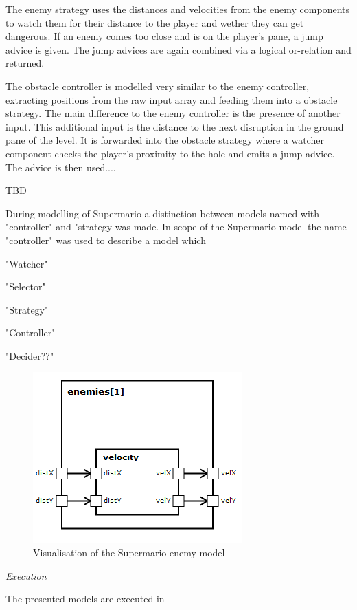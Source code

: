 The enemy strategy uses the distances and velocities from the enemy components to watch them for their distance to the player and wether they can get dangerous. If an enemy comes too close and is on the player's pane, a jump advice is given. The jump advices are again combined via a logical or-relation and returned.


The obstacle controller is modelled very similar to the enemy controller, extracting positions from the raw input array and feeding them into a obstacle strategy. The main difference to the enemy controller is the presence of another input. This additional input is the distance to the next disruption in the ground pane of the level. It is forwarded into the obstacle strategy where a watcher component checks the player's proximity to the hole and emits a jump advice. The advice is then used....

TBD



During modelling of Supermario a distinction between models named with "controller" and "strategy was made.
In scope of the Supermario model the name "controller" was used to describe a model which 

"Watcher"

"Selector"

"Strategy"

"Controller"

"Decider??"





\begin{figure}
	\centering
	\includegraphics[scale=0.5]{pictures/haller_enemy.PNG}
	\caption{Visualisation of the Supermario enemy model}
	\label{fig:marioEnemy}
\end{figure}




\emph{Execution}

The presented models are executed in